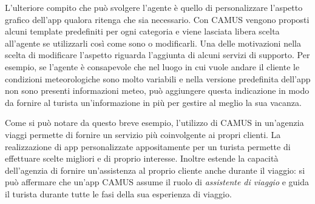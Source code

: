 L'ulteriore compito che può svolgere l'agente è quello di personalizzare l'aspetto grafico dell'app qualora ritenga che sia necessario. Con CAMUS vengono proposti alcuni template predefiniti per ogni categoria e viene lasciata libera scelta all'agente se utilizzarli così come sono o modificarli. Una delle motivazioni nella scelta di modificare l'aspetto riguarda l'aggiunta di alcuni servizi di supporto. Per esempio, se l'agente è consapevole che nel luogo in cui vuole andare il cliente le condizioni meteorologiche sono molto variabili e nella versione predefinita dell'app non sono presenti informazioni meteo, può aggiungere questa indicazione in modo da fornire al turista un'informazione in più per gestire al meglio la sua vacanza.

Come si può notare da questo breve esempio, l'utilizzo di CAMUS in un'agenzia viaggi permette di fornire un servizio più coinvolgente ai propri clienti. La realizzazione di app personalizzate appositamente per un turista permette di effettuare scelte migliori e di proprio interesse. Inoltre estende la capacità dell'agenzia di fornire un'assistenza al proprio cliente anche durante il viaggio: si può affermare che un'app CAMUS assume il ruolo di \emph{assistente di viaggio} e guida il turista durante tutte le fasi della sua esperienza di viaggio.